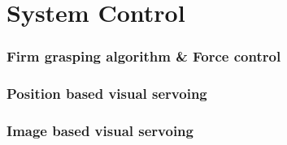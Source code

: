 \section{System Control}

\begin{frame}
\frametitle{Firm grasping algorithm \& Force control}
\end{frame}

\begin{frame}
\frametitle{Position based visual servoing}
\end{frame}

\begin{frame}
\frametitle{Image based visual servoing}
\end{frame}
